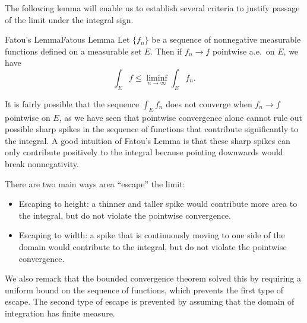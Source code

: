 \documentclass[../main.tex]{subfiles}
\begin{document}
The following lemma will enable us to establish several criteria to justify passage of the limit under the integral sign.

\begin{lemma}{Fatou's Lemma}{Fatous Lemma}
	Let $\{ f_n \}$ be a sequence of nonnegative measurable functions defined on a measurable set $E$. Then if $f_n \to f$ pointwise a.e.\ on $E$, we have
	\begin{equation}
		\int_E f \leq \liminf_{n \to \infty} \int_E f_n.
	\end{equation}
\end{lemma}

\begin{remark}
	It is fairly possible that the sequence $\int_E f_n$ does not converge when $f_n \to f$ pointwise on $E$, as we have seen that pointwise convergence alone cannot rule out possible sharp spikes in the sequence of functions that contribute significantly to the integral. A good intuition of Fatou's Lemma is that these sharp spikes can only contribute positively to the integral because pointing downwards would break nonnegativity.

	There are two main ways area ``escape'' the limit:
	\begin{itemize}
		\item Escaping to height: a thinner and taller spike would contribute more area to the integral, but do not violate the pointwise convergence.
		\item Escaping to width: a spike that is continuously moving to one side of the domain would contribute to the integral, but do not violate the pointwise convergence.
	\end{itemize}

	We also remark that the bounded convergence theorem solved this by requiring a uniform bound on the sequence of functions, which prevents the first type of escape. The second type of escape is prevented by assuming that the domain of integration has finite measure.
\end{remark}
\end{document}

